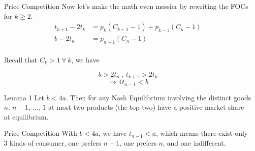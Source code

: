 \documentclass[10pt]{beamer}
\begin{document}
\begin{frame}{Price Competition}
Now let's make the math even messier by rewriting the FOCs for $k \geq 2$.
\begin{equation}
\begin{split}
        t_{k+1} -2t_k &= p_k(C_{k+1} - 1) + p_{k-1}(C_k -1)   \\
             b -2t_n &= p_{n-1} (C_n -1)  \\
\end{split}
\end{equation}

Recall that $C_k >1 \ \forall \ k$, we have

\begin{equation}
    b > 2 t_n \ , \  t_{k+1} >2 t_k
\end{equation}
\begin{equation}
    \Rightarrow 4t_{n-1} < b
\end{equation}
\begin{block}{Lemma 1}
Let $b < 4a$. Then for any Nash Equilibrium involving the distinct goods
$n$, $n - 1$, ..., $1$ at most two products (the top two) have a positive market share at equilibrium. 
\end{block}
\end{frame}

\begin{frame}[t]{Price Competition}
With $b < 4a$, we have $t_{n-1} < a$, which means there exist only 3 kinds of consumer, one prefers $n-1$, one prefers $n$, and one indifferent.

\break
{}
\end{frame}
\end{document}
